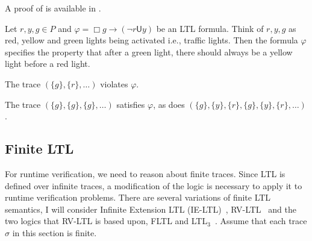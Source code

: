 \documentclass[a4paper]{article}
\newcommand{\U}{\mathsf{U}}
\begin{document}
A proof of  is available in \textcite[249]{baier2008principles}.

\begin{eg}\label{ltleg}
  Let $r,y,g\in P$ and $\varphi = \Box g \to (\neg r \U y)$ be an LTL formula. Think of $r,y,g$ as red, yellow and green lights being activated i.e., traffic lights. Then the formula $\varphi$ specifies the property that after a green light, there should always be a yellow light before a red light.

  The trace $(\{g\},\{r\},\dots)$ violates $\varphi$.

  The trace $(\{g\},\{g\},\{g\},\dots)$ satisfies $\varphi$, as does $(\{g\},\{y\},\{r\},\{g\},\{y\},\{r\},\dots)$.
\end{eg}


\subsection{Finite LTL}
For runtime verification, we need to reason about finite traces. Since LTL is defined over infinite traces, a modification of the logic is necessary to apply it to runtime verification problems.
There are several variations of finite LTL semantics, I will consider Infinite Extension LTL (IE-LTL)~\autocite{rosu2005rewriting}, RV-LTL~\autocite{bauer2010comparing} and the two logics that RV-LTL is based upon, FLTL and LTL$_3$~\autocite{bauer2010comparing}.
Assume that each trace $\sigma$ in this section is finite.
\end{document}
